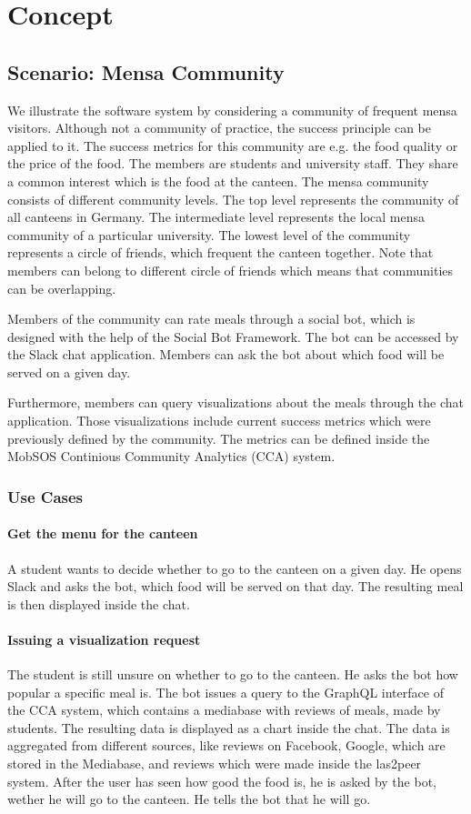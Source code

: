 \chapter{Concept}
\section{Scenario: Mensa Community}
We illustrate the software system by considering a community of frequent mensa visitors.
Although not a community of practice, the success principle can be applied to it.
The success metrics for this community are e.g. the food quality or the price of the food.
The members are students and university staff.
They share a common interest which is the food at the canteen.
The mensa community consists of different community levels.
The top level represents the community of all canteens in Germany.
The intermediate level represents the local mensa community of a particular university.
The lowest level of the community represents a circle of friends, which frequent the canteen together. Note that members can belong to different circle of friends which means that communities can be overlapping.

Members of the community can rate meals through a social bot, which is designed with the help of the Social Bot Framework. The bot can be accessed by the Slack chat application. Members can ask the bot about which food will be served on a given day.

Furthermore, members can query visualizations about the meals through the chat application. Those visualizations include current success metrics which were previously defined by the community. The metrics can be defined inside the MobSOS Continious Community Analytics (CCA) system.

\subsection{Use Cases}

\subsubsection{Get the menu for the canteen} A student wants to decide whether to go to the canteen on a given day. He opens Slack and asks the bot, which food will be served on that day. The resulting meal is then displayed inside the chat.

\subsubsection{Issuing a visualization request}
The student is still unsure on whether to go to the canteen. He asks the bot how popular a specific meal is. The bot issues a query to the GraphQL interface of the CCA system, which contains a mediabase with reviews of meals, made by students. The resulting data is displayed as a chart inside the chat. The data is aggregated from different sources, like reviews on Facebook, Google, which are stored in the Mediabase, and reviews which were made inside the las2peer system. After the user has seen how good the food is, he is asked by the bot, wether he will go to the canteen. He tells the bot that he will go.

